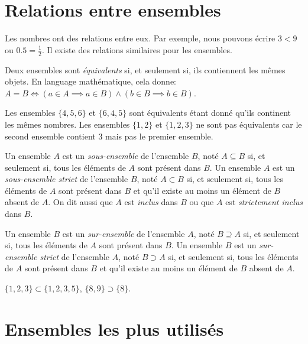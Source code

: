 \section{Relations entre ensembles}

Les nombres ont des relations entre eux. Par exemple, nous pouvons écrire $3<9$ ou $0.5 = \frac12$. Il existe des relations similaires pour les ensembles.

\begin{definition}
    Deux ensembles sont \emph{équivalents} si, et seulement si, ils contiennent les mêmes objets. En language mathématique, cela donne: $A = B \iff (a\in A \implies a\in B) \wedge (b\in B \implies b\in B)$.
\end{definition}
\begin{exemple}
    Les ensembles $\{4, 5, 6\}$ et $\{6, 4, 5\}$ sont équivalents étant donné qu'ils continent les mêmes nombres. Les ensembles $\{1, 2\}$ et $\{1, 2, 3\}$ ne sont pas équivalents car le second ensemble contient $3$ mais pas le premier ensemble.
\end{exemple}

\begin{definition}
    Un ensemble $A$ est un \emph{sous-ensemble} de l'ensemble $B$, noté $A\subseteq B$ si, et seulement si, tous les éléments de $A$ sont présent dans $B$. Un ensemble $A$ est un \emph{sous-ensemble strict} de l'ensemble $B$, noté $A\subset B$ si, et seulement si, tous les éléments de $A$ sont présent dans $B$ et qu'il existe au moins un élément de $B$ absent de $A$. On dit aussi que $A$ est \emph{inclus} dans $B$ ou que $A$ est \emph{strictement inclus} dans $B$.

    Un ensemble $B$ est un \emph{sur-ensemble} de l'ensemble $A$, noté $B\supseteq A$ si, et seulement si, tous les éléments de $A$ sont présent dans $B$. Un ensemble $B$ est un \emph{sur-ensemble strict} de l'ensemble $A$, noté $B\supset A$ si, et seulement si, tous les éléments de $A$ sont présent dans $B$ et qu'il existe au moins un élément de $B$ absent de $A$.
\end{definition}
\begin{exemple}
    $\{1, 2, 3\}\subset \{1, 2, 3, 5\}$, $\{8, 9\} \supset \{8\}$.
\end{exemple}


\section{Ensembles les plus utilisés}

